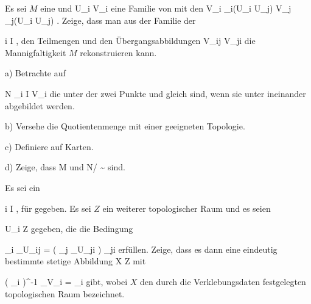 {}
{





Es sei $M$ eine
und
 {U_i } { V_i
} {}
eine Familie von
mit den
 {V_i \cap \alpha_i(U_i \cap U_j) } { V_j \cap \alpha_j(U_i \cap U_j)
} {.}
Zeige, dass man aus der Familie der

 {}
 {i \in I} {}
 {} {} {} {,}
den Teilmengen
 und den Übergangsabbildungen
 {V_{ij}} { V_{ji}
} {}
die Mannigfaltigkeit $M$ rekonstruieren kann.

a) Betrachte auf

\mavergleichskettedisp
{\vergleichskette
{N
}
{ } { \biguplus_{i \in I} V_i
}
{ } {
}
{ } {
}
{ } {
}
}
{}{}{}
die
unter der zwei Punkte
 und
 gleich sind, wenn sie unter
 ineinander abgebildet werden.

b) Versehe die Quotientenmenge
 mit einer geeigneten Topologie.

c) Definiere auf
 Karten.

d) Zeige, dass
\mathkor {} {M} {und} {N/ \sim} {}
sind.





}
{} {}

{}
{





Es sei ein

 {}
 {i \in I} {}
 {} {} {} {,}
für
gegeben. Es sei $Z$ ein weiterer topologischer Raum und es seien

 {U_i } { Z
} {}
gegeben, die die Bedingung

\mavergleichskette
{\vergleichskette
{ \theta_i \vert_{U_{ij} }
}
{ = }{ \left(  \theta_j \vert_{U_{ji} }  \right)  \circ \varphi_{ji}
}
{  }{
}
{    }{
}
{   }{
}
}
{}{}{}
erfüllen. Zeige, dass es dann eine eindeutig bestimmte stetige Abbildung
\maabbdisp {\theta} { X } { Z
} {}
mit

\mavergleichskette
{\vergleichskette
{ \left(  \psi_i  \right)^{-1} \circ \theta \vert_{V_i }
}
{ = }{ \theta_i
}
{  }{
}
{    }{
}
{   }{
}
}
{}{}{}
gibt, wobei $X$ den durch die Verklebungsdaten festgelegten topologischen Raum
 {} {}
bezeichnet.





}
{} {}

